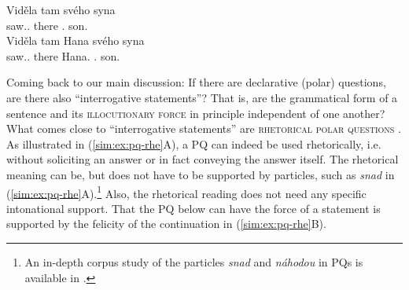 \documentclass[output=paper,colorlinks,citecolor=brown]{langscibook}
\begin{document}
\ea\label{sim:ex:cz-inter}\ea\gll Viděla tam svého syna\label{sim:ex:vinit}\\
saw.{\SG.\FEM} there {\REFL.\POSS} son.{\ACC}\\
\z
\ex\gll Viděla tam Hana svého syna\label{sim:ex:vinit-subj}\\
saw.{\SG.\FEM} there Hana.{\NOM} {\REFL.\POSS} son.{\ACC}\\
\z\z\z

\noindent Coming back to our main discussion: If there are declarative (polar) questions, are there also ``interrogative statements''? That is, are the grammatical form of a sentence and its \textsc{illocutionary force} in principle independent of one another? What comes close to ``interrogative statements'' are \textsc{rhetorical polar questions} \citep{Biezma.Rawlins2017}. As illustrated in (\ref{sim:ex:pq-rhe}A), a PQ can indeed be used rhetorically, i.e. without soliciting an answer or in fact conveying the answer itself. The rhetorical meaning can be, but does not have to be supported by particles, such as \textit{snad} in (\ref{sim:ex:pq-rhe}A).\footnote{An in-depth corpus study of the particles \textit{snad} and \textit{náhodou} in PQs is available in \citet{Chodounska.etal2025}.} Also, the rhetorical reading does not need any specific intonational support. That the PQ below can have the force of a statement is supported by the felicity of the continuation in (\ref{sim:ex:pq-rhe}B).

\ea\begin{xlist}
\end{xlist}
\z
\end{document}

